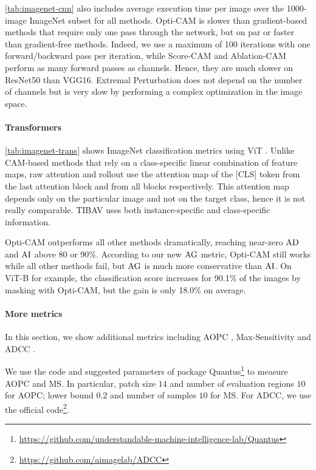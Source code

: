 \noindent \autoref{tab:imagenet-cnn} also includes average execution time per image over the 1000-image 
ImageNet subset for all methods. Opti-CAM is slower than gradient-based methods that require 
only one pass through the network, but on par or faster than gradient-free methods. 
Indeed, we use a maximum of 100 iterations with one forward/backward pass per iteration, 
while Score-CAM and Ablation-CAM perform as many forward passes as channels. Hence, they are much 
slower on ResNet50 than VGG16. Extremal Perturbation does not depend on the number of channels but 
is very slow by performing a complex optimization in the image space.

\paragraph{Transformers}
\autoref{tab:imagenet-trans} shows ImageNet classification metrics using ViT . 
Unlike CAM-based methods that rely on a class-specific linear combination of feature maps, 
raw attention \autocite{dosovitskiy2020image} and rollout \autocite{abnar2020quantifying} use the 
attention map of the [CLS] token from the last attention block and from all blocks respectively. 
This attention map depends only on the particular image and not on the target class, hence it 
is not really comparable. TIBAV \autocite{chefer2021transformer} uses both instance-specific and 
class-specific information.

Opti-CAM outperforms all other methods dramatically, reaching near-zero $\operatorname{AD}$ and $\operatorname{AI}$ above 80 or 
90\%. According to our new $\operatorname{AG}$ metric, Opti-CAM still works while all other methods fail, 
but $\operatorname{AG}$ is much more conservative than $\operatorname{AI}$. On ViT-B for example, the classification score 
increases for 90.1\% of the images by masking with Opti-CAM, but the gain is only 18.0\% on average.

\paragraph{More metrics}
In this section, we show additional metrics including AOPC \autocite{samek2016evaluating}, 
Max-Sensitivity\autocite{yeh2019fidelity} and ADCC \autocite{poppi2021revisiting}.

We use the code and suggested parameters of package 
Quantus\footnote{\url{https://github.com/understandable-machine-intelligence-lab/Quantus}} to 
measure AOPC and MS. In particular, patch size $14$ and number of evaluation regions $10$ for AOPC; 
lower bound $0.2$ and number of samples $10$ for MS.
For ADCC, we use the official code\footnote{\url{https://github.com/aimagelab/ADCC}}.\\

